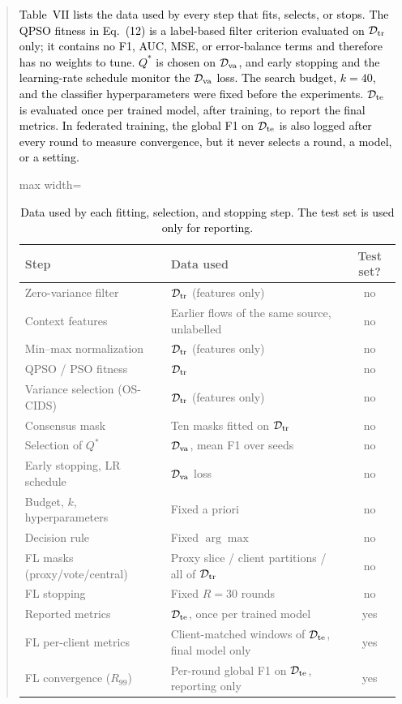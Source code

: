 \documentclass[11pt]{article}
\newenvironment{excerpt}{\begin{quote}\sloppy}{\end{quote}}
\begin{document}
\begin{excerpt}
\textcolor{black}{Table~VII lists the data
used by every step that fits, selects, or stops. The
QPSO fitness in Eq.~(12) is a label-based filter criterion
evaluated on $\mathcal{D}_{\rm tr}$ only; it contains no F1, AUC,
MSE, or error-balance terms and therefore has no weights to tune.
$Q^{*}$ is chosen on $\mathcal{D}_{\rm va}$, and early stopping and
the learning-rate schedule monitor the $\mathcal{D}_{\rm va}$ loss.
The search budget, $k=40$, and the classifier hyperparameters were
fixed before the experiments. $\mathcal{D}_{\rm te}$ is evaluated
once per trained model, after training, to report the final
metrics. In federated training, the global F1 on $\mathcal{D}_{\rm te}$
is also logged after every round to measure convergence, but it never
selects a round, a model, or a setting.}

\setcounter{table}{6}
\begin{table}[H]
\centering
\scriptsize
\caption{\textcolor{black}{Data used by each fitting,
selection, and stopping step. The test set is used only for
reporting.}}

\color{black}
\setlength{\tabcolsep}{3pt}
\renewcommand{\arraystretch}{1.05}
\begin{adjustbox}{max width=\linewidth}
\begin{tabular}{p{2.6cm} p{3.6cm} c}
\hline\toprule
\textbf{Step} & \textbf{Data used} & \textbf{Test set?} \\
\hline\toprule
Zero-variance filter & $\mathcal{D}_{\rm tr}$ (features only) & no \\
Context features & Earlier flows of the same source, unlabelled & no \\
Min--max normalization & $\mathcal{D}_{\rm tr}$ (features only) & no \\
QPSO / PSO fitness & $\mathcal{D}_{\rm tr}$ & no \\
Variance selection (OS-CIDS) & $\mathcal{D}_{\rm tr}$ (features only) & no \\
Consensus mask & Ten masks fitted on $\mathcal{D}_{\rm tr}$ & no \\
Selection of $Q^{*}$ & $\mathcal{D}_{\rm va}$, mean F1 over seeds & no \\
Early stopping, LR schedule & $\mathcal{D}_{\rm va}$ loss & no \\
Budget, $k$, hyperparameters & Fixed a priori & no \\
Decision rule & Fixed $\arg\max$ & no \\
FL masks (proxy/vote/central) & Proxy slice / client partitions / all of $\mathcal{D}_{\rm tr}$ & no \\
FL stopping & Fixed $R=30$ rounds & no \\
\midrule
Reported metrics & $\mathcal{D}_{\rm te}$, once per trained model & yes \\
FL per-client metrics & Client-matched windows of $\mathcal{D}_{\rm te}$, final model only & yes \\
FL convergence ($R_{99}$) & Per-round global F1 on $\mathcal{D}_{\rm te}$, reporting only & yes \\
\hline\toprule
\end{tabular}
\end{adjustbox}
\end{table}


\end{excerpt}
\end{document}
